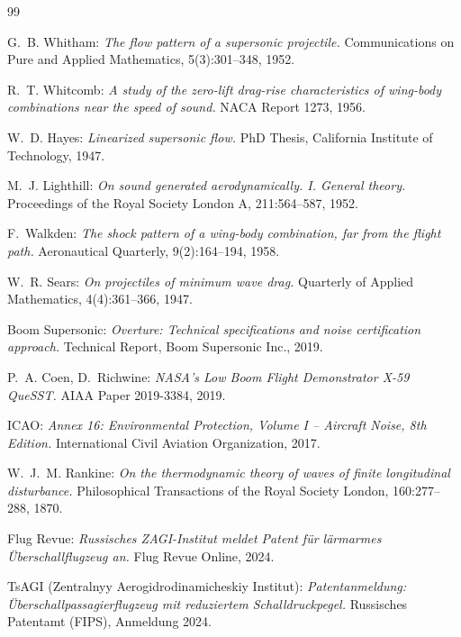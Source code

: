 ﻿\documentclass[12pt,a4paper]{article}
\theoremstyle{definition}
\theoremstyle{remark}
\begin{document}
\begin{thebibliography}{99}

G.~B. Whitham:
\textit{The flow pattern of a supersonic projectile.}
Communications on Pure and Applied Mathematics, 5(3):301--348, 1952.

R.~T. Whitcomb:
\textit{A study of the zero-lift drag-rise characteristics of wing-body combinations near the speed of sound.}
NACA Report 1273, 1956.

W.~D. Hayes:
\textit{Linearized supersonic flow.}
PhD Thesis, California Institute of Technology, 1947.

M.~J. Lighthill:
\textit{On sound generated aerodynamically. I. General theory.}
Proceedings of the Royal Society London A, 211:564--587, 1952.

F.~Walkden:
\textit{The shock pattern of a wing-body combination, far from the flight path.}
Aeronautical Quarterly, 9(2):164--194, 1958.

W.~R. Sears:
\textit{On projectiles of minimum wave drag.}
Quarterly of Applied Mathematics, 4(4):361--366, 1947.

Boom Supersonic:
\textit{Overture: Technical specifications and noise certification approach.}
Technical Report, Boom Supersonic Inc., 2019.

P.~A. Coen, D.~Richwine:
\textit{NASA's Low Boom Flight Demonstrator X-59 QueSST.}
AIAA Paper 2019-3384, 2019.

ICAO:
\textit{Annex 16: Environmental Protection, Volume I -- Aircraft Noise, 8th Edition.}
International Civil Aviation Organization, 2017.

W.~J.~M. Rankine:
\textit{On the thermodynamic theory of waves of finite longitudinal disturbance.}
Philosophical Transactions of the Royal Society London, 160:277--288, 1870.

Flug Revue:
\textit{Russisches ZAGI-Institut meldet Patent für lärmarmes Überschallflugzeug an.}
Flug Revue Online, 2024.

TsAGI (Zentralnyy Aerogidrodinamicheskiy Institut):
\textit{Patentanmeldung: Überschallpassagierflugzeug mit reduziertem Schalldruckpegel.}
Russisches Patentamt (FIPS), Anmeldung 2024.

\end{thebibliography}
\end{document}
